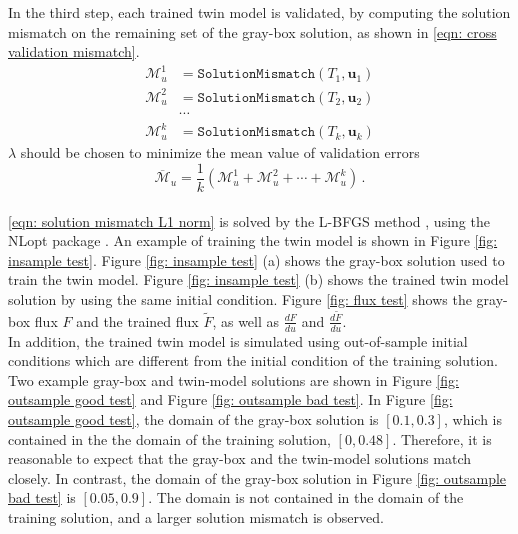 In the third step, each trained twin model is validated, by computing
the solution mismatch on the remaining set of the gray-box solution, as shown in 
\eqref{eqn: cross validation mismatch}.
\begin{equation}\begin{split}
    \mathcal{M}_u^1 &= \texttt{SolutionMismatch}\left( T_1 , \boldsymbol{u}_1\right)\\
    \mathcal{M}_u^2 &= \texttt{SolutionMismatch}\left( T_2 , \boldsymbol{u}_2\right)\\
    &\cdots\\
    \mathcal{M}_u^k &= \texttt{SolutionMismatch}\left( T_k , \boldsymbol{u}_k\right)
    \label{eqn: cross validation mismatch}
\end{split}\end{equation}
$\lambda$ should be chosen to minimize
the mean value of validation errors
\begin{equation}
    \overline{\mathcal{M}}_u = \frac{1}{k}\left(\mathcal{M}_u^1 + \mathcal{M}_u^2 + \cdots 
    + \mathcal{M}_u^k\right)\,.
    \label{eqn: cross validation error mean}
\end{equation}\\


\eqref{eqn: solution mismatch L1 norm} is solved by the L-BFGS method \cite{LBFGS}, using the
NLopt package \cite{nlopt}.
An example of training the twin model is shown in Figure \ref{fig: insample test}.
Figure \ref{fig: insample test} (a) shows the gray-box solution used to train the twin model. 
Figure \ref{fig: insample test} (b) shows the trained twin model solution by using the same initial condition.
Figure \ref{fig: flux test} shows the gray-box flux $F$ and the trained flux $\tilde{F}$, as well as
$\frac{dF}{du}$ and $\frac{d\tilde{F}}{du}$.\\

In addition, the trained twin model is simulated using out-of-sample initial conditions which
are different from the initial condition of the training solution. 
Two example gray-box
and twin-model solutions are shown in Figure \ref{fig: outsample good test} and Figure \ref{fig: outsample bad test}.
In Figure \ref{fig: outsample good test}, the domain of the gray-box solution is $[0.1, 0.3]$, which
is contained in the the domain of the training solution, $[0,0.48]$.
Therefore, it is reasonable to expect that the gray-box and the twin-model
solutions match closely. In contrast, the domain of the gray-box solution in Figure 
\ref{fig: outsample bad test} is $[0.05,0.9]$. The domain is not contained 
in the domain of the training solution, and a larger solution mismatch is observed.\\

